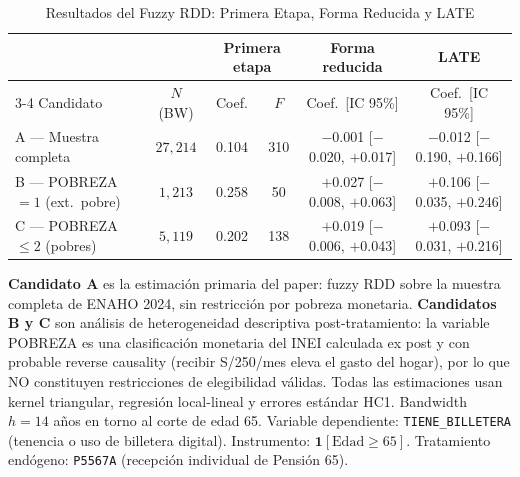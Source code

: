 \begin{table}[htbp]
\centering
\caption{Resultados del Fuzzy RDD: Primera Etapa, Forma Reducida y LATE}
\label{tab:fuzzy_rdd}
\begin{threeparttable}
\begin{tabular}{l c c c c c}
\toprule
& & \multicolumn{2}{c}{\textbf{Primera etapa}} & \textbf{Forma reducida} & \textbf{LATE} \\
\cmidrule(lr){3-4}
Candidato & $N$ (BW) & Coef. & $F$ & Coef.\ [IC 95\%] & Coef.\ [IC 95\%] \\
\midrule
  A — Muestra completa & $27{,}214$ & 0.104 & 310 & $-$0.001 [$-$0.020, $+$0.017] & $-$0.012 [$-$0.190, $+$0.166] \\
  B — POBREZA$=1$ (ext.~pobre) & $1{,}213$ & 0.258 & 50 & $+$0.027 [$-$0.008, $+$0.063] & $+$0.106 [$-$0.035, $+$0.246] \\
  C — POBREZA$\leq 2$ (pobres) & $5{,}119$ & 0.202 & 138 & $+$0.019 [$-$0.006, $+$0.043] & $+$0.093 [$-$0.031, $+$0.216] \\
\bottomrule
\end{tabular}
\begin{tablenotes}[flushleft]
\footnotesize
\item \textbf{Candidato A} es la estimación primaria del paper: fuzzy RDD sobre la muestra completa de ENAHO 2024, sin restricción por pobreza monetaria. \textbf{Candidatos B y C} son análisis de heterogeneidad descriptiva post-tratamiento: la variable POBREZA es una clasificación monetaria del INEI calculada ex post y con probable reverse causality (recibir S/250/mes eleva el gasto del hogar), por lo que NO constituyen restricciones de elegibilidad válidas. Todas las estimaciones usan kernel triangular, regresión local-lineal y errores estándar HC1. Bandwidth $h = 14$ años en torno al corte de edad 65. Variable dependiente: \texttt{TIENE\_BILLETERA} (tenencia o uso de billetera digital). Instrumento: $\mathbf{1}[\text{Edad} \geq 65]$. Tratamiento endógeno: \texttt{P5567A} (recepción individual de Pensión 65).
\end{tablenotes}
\end{threeparttable}
\end{table}